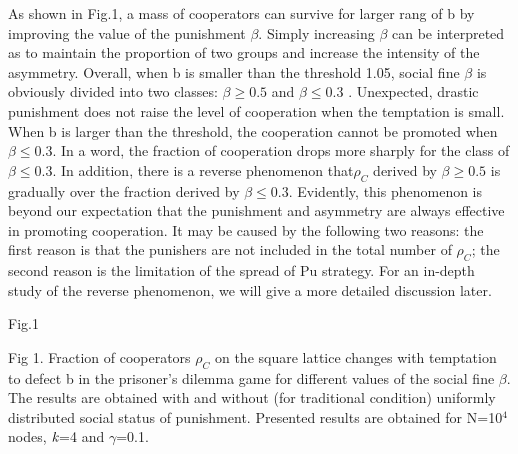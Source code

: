 \documentclass[%
 aip,
 amsmath,amssymb,
 reprint,%
]{revtex4-1}
\begin{document}
As shown in Fig.1, a mass of cooperators can survive for larger rang of b by improving the value of the punishment $\beta$. Simply increasing $\beta$ can be interpreted as to maintain the proportion of two groups and increase the intensity of the asymmetry. Overall, when b is smaller than the threshold 1.05, social fine $\beta$ is obviously divided into two classes: $\beta \geqslant 0.5$ and $\beta \leqslant 0.3$ . Unexpected, drastic punishment does not raise the level of cooperation when the temptation is small. When b is larger than the threshold, the cooperation cannot be promoted when $\beta \leqslant 0.3$. In a word, the fraction of cooperation drops more sharply for the class of $\beta \leqslant 0.3$. In addition, there is a reverse phenomenon that$\rho_C$ derived by $\beta \geqslant 0.5$ is gradually over the fraction derived by $\beta \leqslant 0.3$. Evidently, this phenomenon is beyond our expectation that the punishment and asymmetry are always effective in promoting cooperation. It may be caused by the following two reasons: the first reason is that the punishers are not included in the total number of $\rho_C$; the second reason is the limitation of the spread of Pu strategy. For an in-depth study of the reverse phenomenon, we will give a more detailed discussion later.

Fig.1

Fig 1. Fraction of cooperators $\rho_C$ on the square lattice changes with temptation to defect b in the prisoner's dilemma game for different values of the social fine $\beta$. The results are obtained with and without (for traditional condition) uniformly distributed social status of punishment. Presented results are obtained for N=10$^{4}$ nodes, $\emph{k}$=4 and $\gamma$=0.1.
\end{document}
